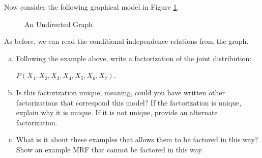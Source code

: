 \documentclass{article}
\newcommand{\ztnodesize}{.6}
\begin{document}
Now consider the following graphical model in Figure \ref{fig:utm}.
\begin{figure}[h!]
	\begin{center}
		\caption{An Undirected Graph}
			\label{fig:utm}
		\end{center}
\end{figure}

As before, we can read the conditional independence relations from the graph. 
\begin{enumerate}[(a)]
\item Following the example above, write a factorization of the joint distribution:

\begin{center}
$P(X_1,X_2,X_3,X_4,X_5,X_6,X_7)$.
\end{center}

\item Is this factorization unique, meaning, could you have written other factorizations that correspond this model? If the factorization is unique, explain why it is unique. If it is not unique, provide an alternate factorization.
\item What is it about these examples that allows them to be factored in this way? Show an example MRF that cannot be factored in this way.
\end{enumerate}
	
\end{document}
